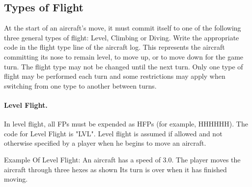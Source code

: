 \subsection{Types of Flight}

At the start of an aircraft's move, it must commit itself to one of the following three general types of flight: Level, Climbing or Diving. Write the appropriate code in the flight type line of the aircraft log. This represents the aircraft committing its nose to remain level, to move up, or to move down for the game turn. The flight type may not be changed until the next turn. Only one type of flight may be performed each turn and some restrictions may apply when switching from one type to another between turns.

\paragraph{Level Flight.} In level flight, all FPs must be expended as HFPs (for example, HHHHHH). The code for Level Flight is "LVL". Level flight is assumed if allowed and not otherwise specified by a player when he begins to move an aircraft.

Example Of Level Flight: An aircraft has a speed of 3.0. The player moves the aircraft through three hexes as shown  Its turn is over when it has finished moving.


